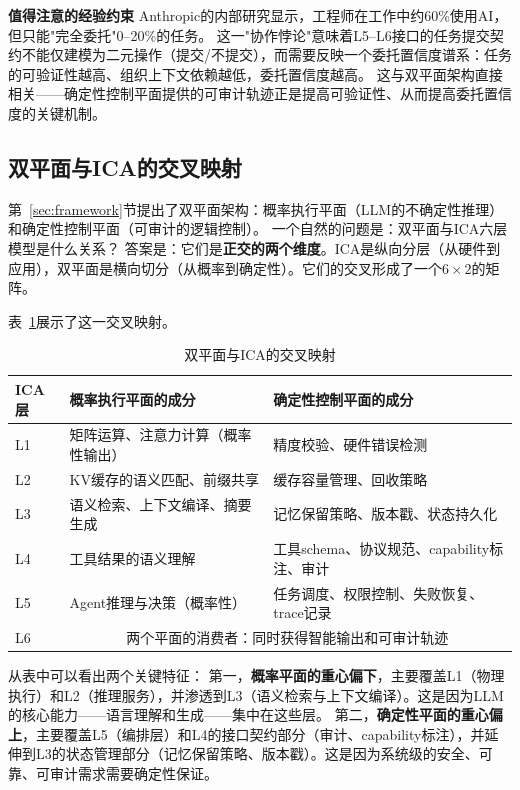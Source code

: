 \textbf{值得注意的经验约束}
Anthropic的内部研究显示，工程师在工作中约60\%使用AI，但只能"完全委托"0--20\%的任务\cite{anthropic2026agenticreport}。
这一"协作悖论"意味着L5--L6接口的任务提交契约不能仅建模为二元操作（提交/不提交），而需要反映一个委托置信度谱系：任务的可验证性越高、组织上下文依赖越低，委托置信度越高。
这与双平面架构直接相关——确定性控制平面提供的可审计轨迹正是提高可验证性、从而提高委托置信度的关键机制。

\subsection{双平面与ICA的交叉映射}
\label{sec:dual-plane-icam}

第~\ref{sec:framework}节提出了双平面架构：概率执行平面（LLM的不确定性推理）和确定性控制平面（可审计的逻辑控制）。
一个自然的问题是：双平面与ICA六层模型是什么关系？
答案是：它们是\textbf{正交的两个维度}。ICA是纵向分层（从硬件到应用），双平面是横向切分（从概率到确定性）。它们的交叉形成了一个$6 \times 2$的矩阵。

表~\ref{tab:dual-plane-icam}展示了这一交叉映射。

\begin{table}[htbp]
\centering
\footnotesize
\caption{双平面与ICA的交叉映射}
\label{tab:dual-plane-icam}
\begin{tabularx}{\textwidth}{p{}p{}p{}}
\toprule
ICA层 & 概率执行平面的成分 & 确定性控制平面的成分 \\
\midrule
L1 & 矩阵运算、注意力计算（概率性输出） & 精度校验、硬件错误检测 \\
L2 & KV缓存的语义匹配、前缀共享 & 缓存容量管理、回收策略 \\
L3 & 语义检索、上下文编译、摘要生成 & 记忆保留策略、版本戳、状态持久化 \\
L4 & 工具结果的语义理解 & 工具schema、协议规范、capability标注、审计 \\
L5 & Agent推理与决策（概率性） & 任务调度、权限控制、失败恢复、trace记录 \\
L6 & \multicolumn{2}{c}{两个平面的消费者：同时获得智能输出和可审计轨迹} \\
\bottomrule
\end{tabularx}
\end{table}

从表中可以看出两个关键特征：
第一，\textbf{概率平面的重心偏下}，主要覆盖L1（物理执行）和L2（推理服务），并渗透到L3（语义检索与上下文编译）。这是因为LLM的核心能力——语言理解和生成——集中在这些层。
第二，\textbf{确定性平面的重心偏上}，主要覆盖L5（编排层）和L4的接口契约部分（审计、capability标注），并延伸到L3的状态管理部分（记忆保留策略、版本戳）。这是因为系统级的安全、可靠、可审计需求需要确定性保证。

